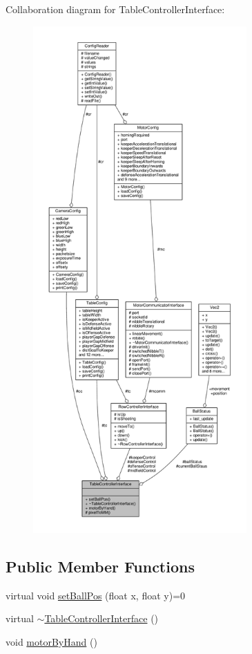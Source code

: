 Collaboration diagram for Table\+Controller\+Interface\+:\nopagebreak
\begin{figure}[H]
\begin{center}
\leavevmode
\includegraphics[height=550pt]{class_table_controller_interface__coll__graph}
\end{center}
\end{figure}
\subsection*{Public Member Functions}
\begin{DoxyCompactItemize}
\item 
virtual void \hyperlink{class_table_controller_interface_ac699a40e0bec06283eb955829982cf07}{set\+Ball\+Pos} (float x, float y)=0
\item 
virtual \hyperlink{class_table_controller_interface_a414f5b11a136161d4808bc8ef0e6077c}{$\sim$\+Table\+Controller\+Interface} ()
\item 
void \hyperlink{class_table_controller_interface_aa096bb34b44565a9eb7f54c6ff8c951a}{motor\+By\+Hand} ()
\end{DoxyCompactItemize}
